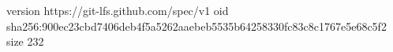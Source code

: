 version https://git-lfs.github.com/spec/v1
oid sha256:900ec23cbd7406deb4f5a5262aaebeb5535b64258330fc83c8c1767e5e68c5f2
size 232
